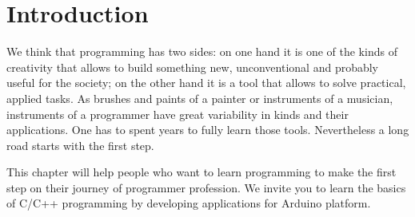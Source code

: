 \documentclass[../sparc.tex]{subfiles}
\begin{document}
\section{Introduction}

We think that programming has two sides: on one hand it is one of the kinds of
creativity that allows to build something new, unconventional and probably
useful for the society; on the other hand it is a tool that allows to solve
practical, applied tasks.  As brushes and paints of a painter or instruments of
a musician, instruments of a programmer have great variability in kinds and
their applications.  One has to spent years to fully learn those tools.
Nevertheless a long road starts with the first step.

This chapter will help people who want to learn programming to make the first
step on their journey of programmer profession.  We invite you to learn the
basics of C/C++ programming by developing applications for Arduino platform.
\end{document}
